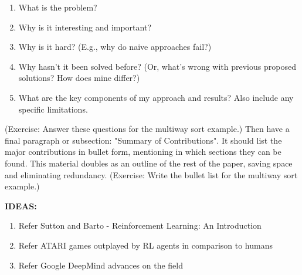\begin{enumerate}
\item What is the problem?
\item Why is it interesting and important?
\item Why is it hard? (E.g., why do naive approaches fail?)
\item Why hasn't it been solved before? (Or, what's wrong with previous proposed solutions? How does mine differ?)
\item What are the key components of my approach and results? Also include any specific limitations.
\end{enumerate}

(Exercise: Answer these questions for the multiway sort example.)
Then have a final paragraph or subsection: "Summary of Contributions". It should list the major contributions in bullet form, mentioning in which sections they can be found. This material doubles as an outline of the rest of the paper, saving space and eliminating redundancy.
(Exercise: Write the bullet list for the multiway sort example.)

\textbf{IDEAS:}
\begin{enumerate}
\item Refer Sutton and Barto - Reinforcement Learning: An Introduction
\item Refer ATARI games outplayed by RL agents in comparison to humans
\item Refer Google DeepMind advances on the field
\end{enumerate}
